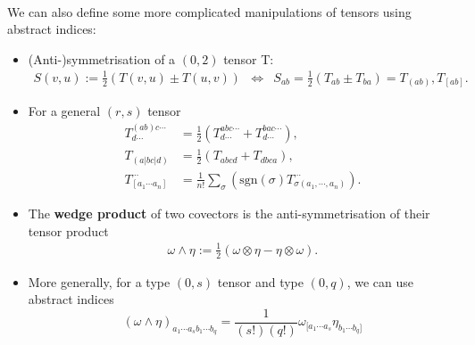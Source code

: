 \documentclass[11pt,fleqn]{report}
\begin{document}
\paragraph{} We can also define some more complicated manipulations of tensors using abstract indices: \begin{itemize}
\item (Anti-)symmetrisation of a $(0,2)$ tensor T:\begin{align}
S(v,u) := \tfrac{1}{2} \left(T(v,u) \pm T(u,v)\right) & \Leftrightarrow & S_{ab} = \tfrac{1}{2}\left(T_{ab} \pm T_{ba}\right) = T_{(ab)},T_{[ab]}.
\end{align}
\item For a general $(r,s)$ tensor \begin{align}
T^{(ab)c\cdots}_{d\cdots} &= \tfrac{1}{2}\left( T^{abc\cdots}_{d\cdots} + T^{bac\cdots}_{d\cdots} \right),\\
T_{(a|bc|d)} &= \tfrac{1}{2} \left( T_{abcd} + T_{dbca}\right), \\
T^{\cdots}_{[a_1\cdots a_n]} &= \tfrac{1}{n!} \sum_\sigma \left(\mathrm{sgn}(\sigma)T^{\cdots}_{\sigma(a_1,\cdots ,a_n)}\right).
\end{align}
\item The \textbf{wedge product} of two covectors is the anti-symmetrisation of their tensor product\begin{align}
\omega \wedge \eta := \tfrac{1}{2}(\omega\otimes\eta-\eta\otimes\omega).
\end{align}
\item More generally, for a type $(0,s)$ tensor and type $(0,q)$, we can use abstract indices \begin{equation}
\left(\omega\wedge\eta\right)_{a_1\cdots a_s b_1 \cdots b_q} = \frac{1}{(s!)(q!)}\omega_{[a_1 \cdots a_s}\eta_{b_1\cdots b_q]}
\end{equation}
\end{itemize}
\end{document}
